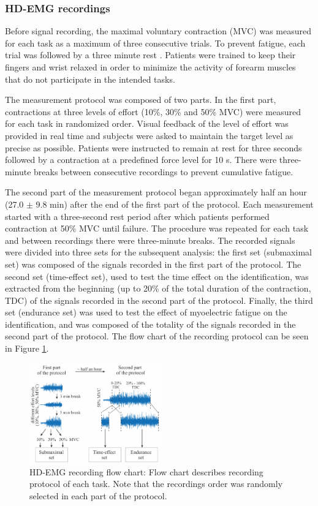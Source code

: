 \subsubsection{HD-EMG recordings}
Before signal recording, the maximal voluntary contraction (MVC) was measured for each task as a maximum of three consecutive trials. To prevent fatigue, each trial was followed by a three minute rest \citep{Pizzigalli2014, Holobar2010}. Patients were trained to keep their fingers and wrist relaxed in order to minimize the activity of forearm muscles that do not participate in the intended tasks.

The measurement protocol was composed of two parts. In the first part, contractions at three levels of effort (10\%, 30\% and 50\% MVC) were measured for each task in randomized order. Visual feedback of the level of effort was provided in real time and subjects were asked to maintain the target level as precise as possible. Patients were instructed to remain at rest for three seconds followed by a contraction at a predefined force level for 10 s. There were three-minute breaks between consecutive recordings to prevent cumulative fatigue.

The second part of the measurement protocol began approximately half an hour (27.0 $\pm$ 9.8 min) after the end of the first part of the protocol. Each measurement started with a three-second rest period after which patients performed contraction at 50\% MVC until failure. The procedure was repeated for each task and between recordings there were three-minute breaks.
The recorded signals were divided into three sets for the subsequent analysis: the first set (submaximal set) was composed of the signals recorded in the first part of the protocol. The second set (time-effect set), used to test the time effect on the identification, was extracted from the beginning (up to 20\% of the total duration of the contraction, TDC) of the signals recorded in the second part of the protocol. Finally, the third set (endurance set) was used to test the effect of myoelectric fatigue on the identification, and was composed of the totality of the signals recorded in the second part of the protocol. The flow chart of the recording protocol can be seen in Figure \ref{fig:1-2}.

\begin{figure}[ht]
\centering
\includegraphics[width=0.5\textwidth]{Images/figure1_2.png}
\caption{HD-EMG recording flow chart: Flow chart describes recording protocol of each task. Note that the recordings order was randomly selected in each part of the protocol.}
\label{fig:1-2}
\end{figure}      



